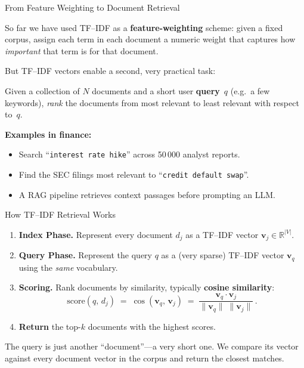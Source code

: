 \documentclass[aspectratio=169]{beamer}
\begin{document}
%
%
\begin{frame}{From Feature Weighting to Document Retrieval}
 
So far we have used TF--IDF as a \textbf{feature-weighting} scheme:
given a fixed corpus, assign each term in each document a numeric weight
that captures how \emph{important} that term is for that document.
 
\medskip
But TF--IDF vectors enable a second, very practical task:
 
\begin{tcolorbox}[colback=blue!5!white, colframe=blue!75!black,
  title=\textbf{Text Retrieval (a.k.a.\ Information Retrieval)}]
Given a collection of $N$ documents and a short user
\textbf{query}~$q$ (e.g.\ a few keywords), \emph{rank} the documents
from most relevant to least relevant with respect to~$q$.
\end{tcolorbox}
 
\medskip
\textbf{Examples in finance:}
\begin{itemize}
\item Search ``\texttt{interest rate hike}'' across 50\,000 analyst reports.
\item Find the SEC filings most relevant to ``\texttt{credit default swap}''.
\item A RAG pipeline retrieves context passages before prompting an LLM.
\end{itemize}
 
\end{frame}
%
%
\begin{frame}{How TF--IDF Retrieval Works}
 
\begin{enumerate}
\item \textbf{Index Phase.} Represent every document $d_j$ as a TF--IDF
      vector $\mathbf{v}_j \in \mathbb{R}^{|V|}$.
\item \textbf{Query Phase.} Represent the query $q$ as a (very sparse)
      TF--IDF vector $\mathbf{v}_q$ using the \emph{same} vocabulary.
\item \textbf{Scoring.} Rank documents by similarity, typically
      \textbf{cosine similarity}:
\[
  \text{score}(q,\, d_j)
  \;=\;
  \cos(\mathbf{v}_q,\, \mathbf{v}_j)
  \;=\;
  \frac{\mathbf{v}_q \cdot \mathbf{v}_j}
       {\|\mathbf{v}_q\|\;\|\mathbf{v}_j\|}\,.
\]
\item \textbf{Return} the top-$k$ documents with the highest scores.
\end{enumerate}
 
\medskip
\begin{tcolorbox}[colback=gray!8, colframe=gray!60,
  title=\textbf{Key idea}]
The query is just another ``document''---a very short one.
We compare its vector against every document vector in the corpus
and return the closest matches.
\end{tcolorbox}
 
\end{frame}
\end{document}
